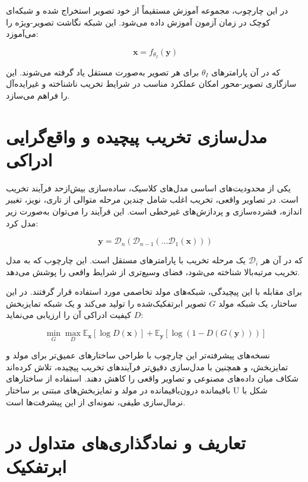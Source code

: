 در این چارچوب، مجموعه آموزش مستقیماً از خود تصویر استخراج شده و شبکه‌ای کوچک در زمان آزمون آموزش داده می‌شود. این شبکه نگاشت تصویر-ویژه را می‌آموزد:

\begin{equation}
	\mathbf{x} = f_{\theta_I}(\mathbf{y})
\end{equation}

که در آن پارامترهای $\theta_I$ برای هر تصویر به‌صورت مستقل یاد گرفته می‌شوند. این سازگاری تصویر-محور امکان عملکرد مناسب در شرایط تخریب ناشناخته و غیرایده‌آل را فراهم می‌سازد.

\section{مدل‌سازی تخریب پیچیده و واقع‌گرایی ادراکی}

یکی از محدودیت‌های اساسی مدل‌های کلاسیک، ساده‌سازی بیش‌ازحد فرآیند تخریب است. در تصاویر واقعی، تخریب اغلب شامل چندین مرحله متوالی از تاری، نویز، تغییر اندازه، فشرده‌سازی و پردازش‌های غیرخطی است. این فرآیند را می‌توان به‌صورت زیر مدل کرد:

\begin{equation}
	\mathbf{y} =
	\mathcal{D}_n
	(
	\mathcal{D}_{n-1}
	(
	\dots
	\mathcal{D}_1(\mathbf{x})
	)
	)
\end{equation}

که در آن هر $\mathcal{D}_i$ یک مرحله تخریب با پارامترهای مستقل است. این چارچوب که به مدل تخریب مرتبه‌بالا شناخته می‌شود، فضای وسیع‌تری از شرایط واقعی را پوشش می‌دهد.

برای مقابله با این پیچیدگی، شبکه‌های مولد تخاصمی مورد استفاده قرار گرفتند. در این ساختار، یک شبکه مولد $G$ تصویر ابرتفکیک‌شده را تولید می‌کند و یک شبکه تمایزبخش $D$ کیفیت ادراکی آن را ارزیابی می‌نماید:

\begin{equation}
	\min_G \max_D
	\mathbb{E}_{\mathbf{x}}[\log D(\mathbf{x})]
	+
	\mathbb{E}_{\mathbf{y}}[\log(1 - D(G(\mathbf{y})))]
\end{equation}

نسخه‌های پیشرفته‌تر این چارچوب با طراحی ساختارهای عمیق‌تر برای مولد و تمایزبخش، و همچنین با مدل‌سازی دقیق‌تر فرآیندهای تخریب پیچیده، تلاش کرده‌اند شکاف میان داده‌های مصنوعی و تصاویر واقعی را کاهش دهند. استفاده از ساختارهای باقیمانده درون‌باقیمانده در مولد و تمایزبخش‌های مبتنی بر ساختار U شکل با نرمال‌سازی طیفی، نمونه‌ای از این پیشرفت‌ها است.
\section{تعاریف و نمادگذاری‌های متداول در ابرتفکیک}

